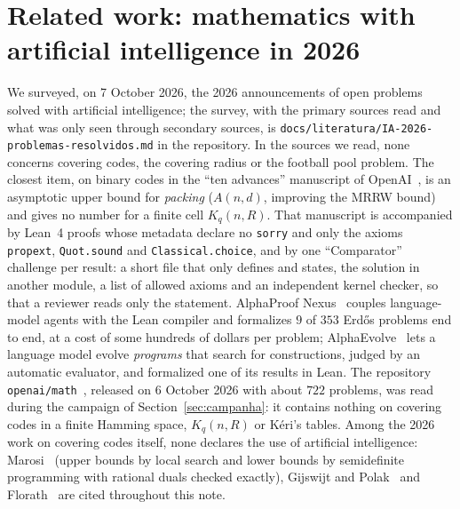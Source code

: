\documentclass[11pt]{amsart}
\theoremstyle{definition}
\theoremstyle{remark}
\begin{document}
\section{Related work: mathematics with artificial intelligence in 2026}\label{sec:related}
We surveyed, on 7 October 2026, the 2026 announcements of open problems solved with artificial intelligence; the survey, with the primary sources read and what was only seen through secondary sources, is \texttt{docs/\allowbreak literatura/\allowbreak IA-2026-problemas-resolvidos.md} in the repository.
In the sources we read, none concerns covering codes, the covering radius or the football pool problem.
The closest item, on binary codes in the ``ten advances'' manuscript of OpenAI~\cite{openai2026ten}, is an asymptotic upper bound for \emph{packing} ($A(n,d)$, improving the MRRW bound) and gives no number for a finite cell $K_q(n,R)$.
That manuscript is accompanied by Lean~4 proofs whose metadata declare no \texttt{sorry} and only the axioms \texttt{propext}, \texttt{Quot.sound} and \texttt{Classical.choice}, and by one ``Comparator'' challenge per result: a short file that only defines and states, the solution in another module, a list of allowed axioms and an independent kernel checker, so that a reviewer reads only the statement.
AlphaProof Nexus~\cite{alphaproofnexus} couples language-model agents with the Lean compiler and formalizes $9$ of $353$ Erdős problems end to end, at a cost of some hundreds of dollars per problem; AlphaEvolve~\cite{alphaevolve} lets a language model evolve \emph{programs} that search for constructions, judged by an automatic evaluator, and formalized one of its results in Lean.
The repository \texttt{openai/math}~\cite{openaimath}, released on 6 October 2026 with about $722$ problems, was read during the campaign of Section~\ref{sec:campanha}: it contains nothing on covering codes in a finite Hamming space, $K_q(n,R)$ or Kéri's tables.
Among the 2026 work on covering codes itself, none declares the use of artificial intelligence: Marosi~\cite{marosi2026} (upper bounds by local search and lower bounds by semidefinite programming with rational duals checked exactly), Gijswijt and Polak~\cite{gp2025} and Florath~\cite{florath2026} are cited throughout this note.
\end{document}
